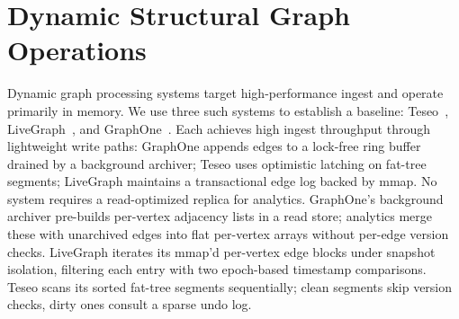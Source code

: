 \section{Dynamic Structural Graph Operations}
\label{sec:eval:dynamic}


Dynamic graph processing systems target high-performance
ingest and operate primarily in memory.
We use three such systems to establish a baseline:
Teseo~\cite{teseo2021deLeo}, LiveGraph~\cite{zhu2019livegraph}, and
GraphOne~\cite{graphone2019kumar}.
Each achieves high ingest throughput through lightweight write paths:
GraphOne appends edges to a lock-free ring buffer drained by a background archiver; Teseo uses optimistic latching on fat-tree segments; LiveGraph maintains a transactional edge log backed by mmap.
No system requires a read-optimized replica for analytics.
GraphOne's background archiver pre-builds per-vertex adjacency lists in a read store; analytics merge these with unarchived edges into flat per-vertex arrays without per-edge version checks.
LiveGraph iterates its mmap'd per-vertex edge blocks under snapshot isolation, filtering each entry with two epoch-based timestamp comparisons.
Teseo scans its sorted fat-tree segments sequentially; clean segments skip version checks, dirty ones consult a sparse undo log. 
 

